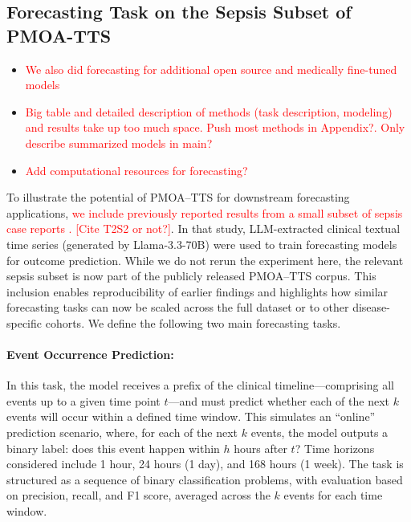 \subsection{Forecasting Task on the Sepsis Subset of PMOA-TTS}

\begin{itemize}
    \item \textcolor{red}{We also did forecasting for additional open source and medically fine-tuned models}
    \item \textcolor{red}{Big table and detailed description of methods (task description, modeling) and results take up too much space. Push most methods in Appendix?. Only describe summarized models in main?}
    \item \textcolor{red}{Add computational resources for forecasting?}
\end{itemize}


To illustrate the potential of PMOA–TTS for downstream forecasting applications, \textcolor{red}{we include previously reported results from a small subset of sepsis case reports \citep{noroozizadeh2025reconstructing}. [Cite T2S2 or not?]}. In that study, LLM-extracted clinical textual time series (generated by Llama-3.3-70B) were used to train forecasting models for outcome prediction. While we do not rerun the experiment here, the relevant sepsis subset is now part of the publicly released PMOA–TTS corpus. This inclusion enables reproducibility of earlier findings and highlights how similar forecasting tasks can now be scaled across the full dataset or to other disease-specific cohorts. 
We define the following two main forecasting tasks.

\paragraph{Event Occurrence Prediction:} In this task, the model receives a prefix of the clinical timeline—comprising all events up to a given time point $t$—and must predict whether each of the next $k$ events will occur within a defined time window. This simulates an “online” prediction scenario, where, for each of the next $k$ events, the model outputs a binary label: does this event happen within $h$ hours after $t$? Time horizons considered include 1 hour, 24 hours (1 day), and 168 hours (1 week). The task is structured as a sequence of binary classification problems, with evaluation based on precision, recall, and F1 score, averaged across the $k$ events for each time window.

